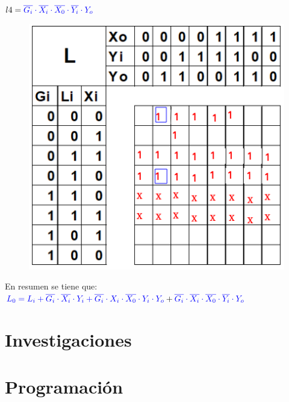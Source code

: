 \documentclass[12pt,letterpaper]{book}
\begin{document}
\begin{multicols}{2}
$l4=\textcolor{blue}{\overline{G_i} \cdot \overline{ X_i} \cdot \overline{X_0} \cdot \overline{Y_i}  \cdot Y_o}$
\begin{figure}[H]
\centering
\includegraphics[width=1\linewidth]{figures/k10.png}
\caption{}
\label{k10}
\end{figure}
\vspace{0.2cm}

En resumen se tiene que:\\
$\textcolor{blue}{L_0=L_i+\overline{G_i} \cdot \overline{X_i} \cdot Y_i+\overline{G_i} \cdot X_i \cdot \overline{X_0} \cdot Y_i \cdot Y_o }+\textcolor{blue}{\overline{G_i} \cdot \overline{ X_i} \cdot \overline{X_0} \cdot \overline{Y_i}  \cdot Y_o}$

\end{multicols}

\chapter{Investigaciones}


\chapter{Programación}
\end{document}
